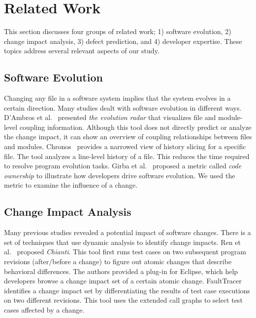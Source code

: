 \section{Related Work}
\label{sec:related}

This section discusses four groups of related work; 1) software evolution, 2)
change impact analysis, 3) defect prediction, and 4) developer expertise. These
topics address several relevant aspects of our study.

\subsection{Software Evolution}
Changing any file in a software system implies that the system evolves in a
certain direction. Many studies dealt with software evolution in different ways.
D'Ambros et al.~\cite{dambros_evolution_2006} presented \emph{the evolution
radar} that visualizes file and module-level coupling information. Although this
tool does not directly predict or analyze the change impact, it can show an
overview of coupling relationships between files and modules.
Chronos~\cite{servant_history_2012} provides a narrowed view of history
slicing for a specific file. The tool analyzes a line-level history of a file.
This reduces the time required to resolve program evolution tasks. Girba et
al.~\cite{girba_how_2005} proposed a metric called \emph{code ownership} to
illustrate how developers drive software evolution. We used the metric to
examine the influence of a change.


\subsection{Change Impact Analysis}

Many previous studies revealed a potential impact of software changes. There is a
set of techniques that use dynamic analysis to identify change impacts. Ren et
al.~\cite{ren_chianti:_2004} proposed \emph{Chianti}. This tool first runs test
cases on two subsequent program revisions (after/before a change) to figure out
atomic changes that describe behavioral differences. The authors provided a
plug-in for Eclipse, which help developers browse a change impact set of a
certain atomic change. FaultTracer~\cite{zhang_faulttracer:_2012} identifies
a change impact set by differentiating the results of test case executions on
two different revisions. This tool uses the extended call graphs to select
test cases affected by a change.


